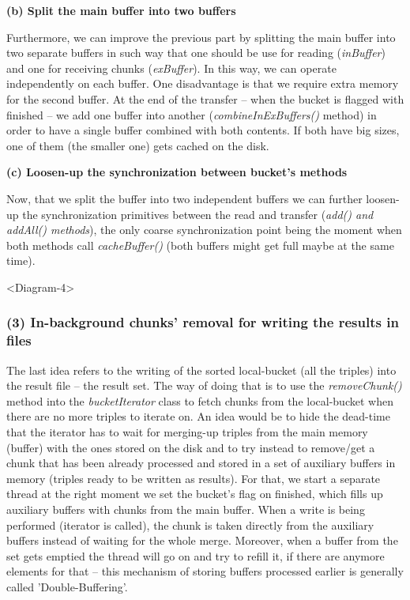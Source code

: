 \textbf{(b) Split the main buffer into two buffers}

Furthermore, we can improve the previous part by splitting the main buffer into two separate buffers in such way that one should be use for reading (\textit{inBuffer}) and one for receiving chunks (\textit{exBuffer}). In this way, we can operate independently on each buffer. One disadvantage is that we require extra memory for the second buffer. At the end of the transfer -- when the bucket is flagged with finished -- we add one buffer into another (\textit{combineInExBuffers()} method) in order to have a single buffer combined with both contents. If both have big sizes, one of them (the smaller one) gets cached on the disk.

\textbf{(c) Loosen-up the synchronization between bucket's methods}

Now, that we split the buffer into two independent buffers we can further loosen-up the synchronization primitives between the read and transfer (\textit{add() and addAll() methods}), the only coarse synchronization point being the moment when both methods call \textit{cacheBuffer()} (both buffers might get full maybe at the same time).

<Diagram-4>

% 
\subsubsection*{(3) In-background chunks' removal for writing the results in files}

The last idea refers to the writing of the sorted local-bucket (all the triples) into the result file -- the result set. The way of doing that is to use the \textit{removeChunk()} method into the \textit{bucketIterator} class to fetch chunks from the local-bucket when there are no more triples to iterate on. An idea would be to hide the dead-time that the iterator has to wait for merging-up triples from the main memory (buffer) with the ones stored on the disk and to try instead to remove/get a chunk that has been already processed and stored in a set of auxiliary buffers in memory (triples ready to be written as results). For that, we start a separate thread at the right moment we set the bucket's flag on finished, which fills up auxiliary buffers with chunks from the main buffer. When a write is being performed (iterator is called), the chunk is taken directly from the auxiliary buffers instead of waiting for the whole merge. Moreover, when a buffer from the set gets emptied the thread will go on and try to refill it, if there are anymore elements for that -- this mechanism of storing buffers processed earlier is generally called 'Double-Buffering'.

